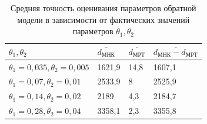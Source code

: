 \begin{table}[b]
  \caption{%
    Средняя точность оценивания параметров обратной модели в
    зависимости от фактических значений параметров \( \theta_1, \theta_2 \)
  }\label{tbl:comparison_nonlinear_inverse}
  \begin{tabular}{| m{5cm} | M{3.3cm} | M{3.3cm} | M{3.5cm} |}
    \hline
    \( \theta_1, \theta_2 \)
    & \( \overline{d_{\text{МНК}}} \)
    & \( \overline{d_{\text{МРТ}}} \)
    & \( \overline{d_{\text{МНК}} - d_{\text{МРТ}}} \) \\
    \hline
    \( \theta_1 = 0{,}035, \theta_2 = 0{,}005 \)
    & 1621{,}9
    & 14{,}8
    & 1607{,}1 \\
    \hline
    \( \theta_1 = 0{,}07, \theta_2 = 0{,}01 \)
    & 2533{,}9
    & 8
    & 2525{,}9 \\
    \hline
    \( \theta_1 = 0{,}14, \theta_2 = 0{,}02 \)
    & 2189
    & 4{,}3
    & 2184{,}7 \\
    \hline
    \( \theta_1 = 0{,}28, \theta_2 = 0{,}04 \)
    & 3358{,}1
    & 2{,}3
    & 3355{,}8 \\
    \hline
  \end{tabular}
\end{table}

